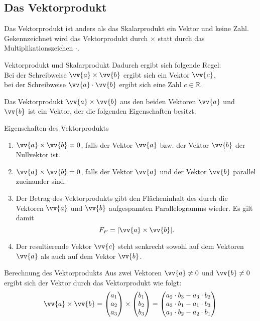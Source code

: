 \subsection{Das Vektorprodukt}
Das Vektorprodukt ist anders als das Skalarprodukt ein Vektor und keine Zahl. Gekennzeichnet wird das Vektorprodukt durch $\times$ statt durch das Multiplikationszeichen $\cdot$. \\
\begin{b8d*}{Vektorprodukt und Skalarprodukt}{}
Dadurch ergibt sich folgende Regel:\\
Bei der Schreibweise $\vv{a} \times\vv{b}$ ergibt sich ein Vektor $\vv{c}$,\\
bei der Schreibweise $\vv{a} \cdot \vv{b}$ ergibt sich eine Zahl $c\in \mathds{R}$.
\end{b8d*}
Das Vektorprodukt $\vv{a} \times \vv{b}$ aus den beiden Vektoren $\vv{a}$ und $\vv{b}$ ist ein Vektor, der die folgenden Eigenschaften besitzt.
\begin{merke}{Eigenschaften des Vektorprodukts}{}
   \begin{enumerate}
       \item $\vv{a} \times \vv{b} = 0$, falls der Vektor $\vv{a}$ bzw. der Vektor $\vv{b}$ der Nullvektor ist.
       \item $\vv{a} \times \vv{b} = 0$, falls der Vektor $\vv{a}$ und der Vektor $\vv{b}$ parallel zueinander sind.
       \item Der Betrag des Vektorprodukts gibt den Flächeninhalt des durch die Vektoren $\vv{a} $ und $\vv{b}$ aufgespannten Parallelogramms wieder. Es gilt damit $$F_P=|\vv{a} \times \vv{b} |.$$
       \item Der resultierende Vektor $\vv{c} $ steht senkrecht sowohl auf dem Vektoren $\vv{a} $ als auch auf dem Vektor $\vv{b}$.
   \end{enumerate} 
\end{merke}
\begin{defi*}{Berechnung des Vektorprodukts}{}
Aus zwei Vektoren $\vv{a}\neq 0$ und $\vv{b} \neq 0$ ergibt sich der Vektor durch das Vektorprodukt wie folgt: $$\vv{a} \times \vv{b} = \begin{pmatrix} a_1 \\a_2\\a_3\end{pmatrix} \times \begin{pmatrix} b_1 \\b_2\\b_3\end{pmatrix} = \begin{pmatrix} a_2\cdot b_3 - a_3\cdot b_2 \\a_3\cdot b_1 - a_1\cdot b_3\\a_1\cdot b_2 - a_2\cdot b_1\end{pmatrix}$$
\end{defi*}
